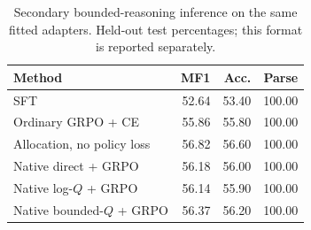 \begin{table}[t]
\centering\small
\setlength{\tabcolsep}{3pt}
\begin{tabular}{lrrr}
\toprule
Method & MF1 & Acc. & Parse \\
\midrule
SFT & 52.64 & 53.40 & 100.00 \\
Ordinary GRPO + CE & 55.86 & 55.80 & 100.00 \\
Allocation, no policy loss & 56.82 & 56.60 & 100.00 \\
Native direct + GRPO & 56.18 & 56.00 & 100.00 \\
Native log-$Q$ + GRPO & 56.14 & 55.90 & 100.00 \\
Native bounded-$Q$ + GRPO & 56.37 & 56.20 & 100.00 \\
\bottomrule
\end{tabular}
\caption{Secondary bounded-reasoning inference on the same fitted adapters. Held-out test percentages; this format is reported separately.}
\end{table}
